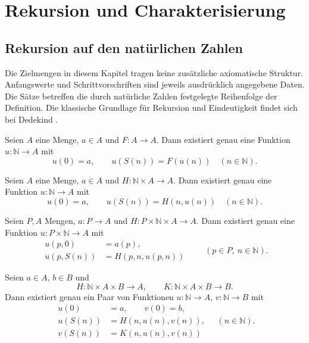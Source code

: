 \chapter{Rekursion und Charakterisierung}
\label{b10guide:ch:recursion}

\section{Rekursion auf den natürlichen Zahlen}

Die Zielmengen in diesem Kapitel tragen keine zusätzliche axiomatische
Struktur. Anfangswerte und Schrittvorschriften sind jeweils ausdrücklich
angegebene Daten. Die Sätze betreffen die durch natürliche Zahlen
festgelegte Reihenfolge der Definition. Die klassische Grundlage
für Rekursion und Eindeutigkeit findet sich bei Dedekind \cite{dedekind}.

\begin{theorem}
\label{b10guide:thm:dedekind}
Seien $A$ eine Menge, $a\in A$ und $F\colon A\to A$.
Dann existiert genau eine Funktion $u\colon\mathbb N\to A$ mit
\[
 u(0)=a,\qquad u(S(n))=F(u(n))\quad(n\in\mathbb N).
\]
\end{theorem}

\begin{theorem}
\label{b10guide:thm:step-recursion}
Seien $A$ eine Menge, $a\in A$ und
$H\colon\mathbb N\times A\to A$.
Dann existiert genau eine Funktion $u\colon\mathbb N\to A$ mit
\[
 u(0)=a,\qquad u(S(n))=H(n,u(n))\quad(n\in\mathbb N).
\]
\end{theorem}

\begin{theorem}
\label{b10guide:thm:parameter-recursion}
Seien $P,A$ Mengen, $a\colon P\to A$ und
$H\colon P\times\mathbb N\times A\to A$.
Dann existiert genau eine Funktion $u\colon P\times\mathbb N\to A$
mit
\[
 \begin{aligned}
 u(p,0)&=a(p),\\
 u(p,S(n))&=H(p,n,u(p,n))
 \end{aligned}
 \qquad(p\in P,\ n\in\mathbb N).
\]
\end{theorem}

\begin{theorem}
\label{b10guide:thm:simultaneous-recursion}
Seien $a\in A$, $b\in B$ und
\[
 H\colon\mathbb N\times A\times B\to A,
 \qquad K\colon\mathbb N\times A\times B\to B.
\]
Dann existiert genau ein Paar von Funktionen
$u\colon\mathbb N\to A$, $v\colon\mathbb N\to B$ mit
\[
 \begin{aligned}
 u(0)&=a,\qquad v(0)=b,\\
 u(S(n))&=H(n,u(n),v(n)),\\
 v(S(n))&=K(n,u(n),v(n))
 \end{aligned}
 \quad(n\in\mathbb N).
\]
\end{theorem}


